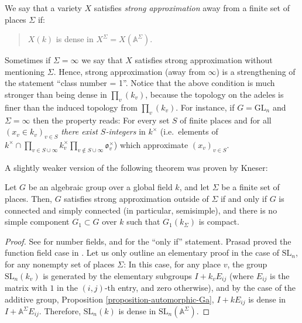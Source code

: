 \begin{definition}
 \label{definition-strong-approximation}
We say that a variety $X$ satisfies {\it strong approximation} away from a finite set of places $\Sigma$ if:
\begin{quote}
 $X(k)$ is dense in $X^\Sigma=X(\mathbb A^\Sigma)$. 
\end{quote}
Sometimes if $\Sigma=\infty$ we say that $X$ satisfies strong approximation without mentioning $\Sigma$. Hence, strong approximation (away from $\infty$) is a strengthening of the statement ``class number = 1''. Notice that the above condition is much stronger than being dense in $\prod_v(k_v)$, because the topology on the adeles is finer than the induced topology from $\prod_v(k_v)$. For instance, if $G=\text{GL}_n$ and $\Sigma=\infty$ then the property reads: For every set $S$ of finite places and for all $(x_v\in k_v)_{v\in S}$ \emph{there exist $S$-integers} in $k^\times$ (i.e.\ elements of $k^\times\cap \prod_{v\in S\cup\infty} k_v^\times \prod_{v\notin S\cup\infty} \mathfrak o_v^\times$) which approximate $(x_v)_{v\in S}$. 
 
\end{definition}



A slightly weaker version of the following theorem was proven by Kneser:
\begin{theorem}
\label{theorem-strong-approximation}
 Let $G$ be an algebraic group over a global field $k$, and let $\Sigma$ be a finite set of places. Then, $G$ satisfies strong approximation outside of $\Sigma$ if and only if $G$ is connected and simply connected (in particular, semisimple), and there is no simple component $G_1\subset G$ over $k$ such that $G_1(k_\Sigma)$ is compact.
\end{theorem}

\begin{proof}
 See \cite[\S 7.4]{Platonov-Rapinchuk} for number fields, and for the ``only if'' statement. Prasad proved the function field case in \cite{Prasad-strong}. Let us only outline an elementary proof in the case of $\text{SL}_n$, for any nonempty set of places $\Sigma$: In this case, for any place $v$, the group $\text{SL}_n(k_v)$ is generated by the elementary subgroups $I+ k_v E_{ij}$ (where $E_{ij}$ is the matrix with $1$ in the $(i,j)$-th entry, and zero otherwise), and by the case of the additive group, Proposition \ref{proposition-automorphic-Ga}, $I+kE_{ij}$ is dense in $I+ \mathbb A^\Sigma E_{ij}$. Therefore, $\text{SL}_n(k)$ is dense in $\text{SL}_n(\mathbb A^\Sigma)$. 
\end{proof}


